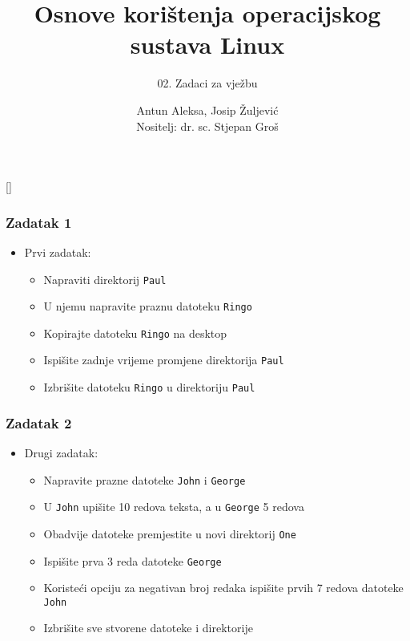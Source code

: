 \documentclass{beamer}
\title{Osnove korištenja operacijskog sustava Linux}
\subtitle{02. Zadaci za vježbu}
\author[Antun Aleksa, Josip Žuljević]{Antun Aleksa, Josip Žuljević\\{\small Nositelj: dr. sc. Stjepan Groš}}
\institute[FER]{Sveučilište u Zagrebu \\
				Fakultet elektrotehnike i računarstva}
\date{\todayiso}
\newcommand{\shell}[1]{\texttt{#1}}
\begin{document}
{
[] %

\begin{frame}
\maketitle
\end{frame}
}

\begin{frame}[t]
\frametitle{Zadatak 1}
\begin{itemize}
  \item Prvi zadatak:
  \begin{itemize}
		\item Napraviti direktorij \shell{Paul}
		\item U njemu napravite praznu datoteku \shell{Ringo}
		\item Kopirajte datoteku \shell{Ringo} na desktop
		\item Ispišite zadnje vrijeme promjene direktorija \shell{Paul}
		\item Izbrišite datoteku \shell{Ringo} u direktoriju \shell{Paul}
  \end{itemize}
\end{itemize}
\end{frame}

\begin{frame}[t]
\frametitle{Zadatak 2}
\begin{itemize}
	\item Drugi zadatak:
	\begin{itemize}
		\item Napravite prazne datoteke \shell{John} i \shell{George}
		\item U \shell{John} upišite 10 redova teksta, a u \shell{George} 5 redova
		\item Obadvije datoteke premjestite u novi direktorij \shell{One}
		\item Ispišite prva 3 reda datoteke \shell{George}
		\item Koristeći opciju za negativan broj redaka ispišite prvih 7 redova datoteke \shell{John}
		\item Izbrišite sve stvorene datoteke i direktorije
	\end{itemize}
\end{itemize}
\end{frame}
\end{document}
